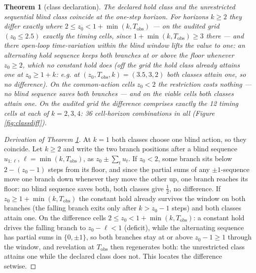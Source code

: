 \documentclass[10pt,twocolumn]{article}
\theoremstyle{plain}
\newtheorem{theorem}{Theorem}
\theoremstyle{definition}
\theoremstyle{remark}
\begin{document}
\begin{theorem}[class declaration]\label{thm:class}
The declared hold class and the unrestricted sequential blind class
coincide at the one-step horizon. For horizons \(k \ge 2\) they differ
exactly where \(2 \le z_{0} < 1 + \min(k, T_{\mathrm{obs}})\) --- on
the audited grid \((z_{0} \le 2.5)\) exactly the timing cells, since
\(1 + \min(k, T_{\mathrm{obs}}) \ge 3\) there --- and there open-loop
time-variation within the blind window lifts the value to one: an
alternating hold sequence keeps both branches at or above the floor
whenever \(z_{0} \ge 2\), which no constant hold does (off the grid
the hold class already attains one at \(z_{0} \ge 1 + k\): e.g. at
\((z_{0}, T_{\mathrm{obs}}, k) = (3.5, 3, 2)\) both classes attain
one, so no difference). On the
common-action cells \(z_{0} < 2\) the restriction costs nothing --- no
blind sequence saves both branches --- and on the viable cells both
classes attain one. On the audited grid the difference comprises exactly
the 12 timing cells at each of \(k = 2, 3, 4\): 36 cell-horizon
combinations in all (Figure \ref{fig:classdiff}).
\end{theorem}

\begin{proof}[Derivation of Theorem \ref{thm:class}]
At \(k = 1\) both classes choose one blind action, so they coincide. Let
\(k \ge 2\) and write the two branch positions after a blind sequence
\(u_{1:\ell}\), \(\ell = \min(k, T_{\mathrm{obs}})\), as
\(z_{0} \pm \sum_{t} u_{t}\). If \(z_{0} < 2\), some branch sits below
\(2 - (z_{0} - 1)\) steps from its floor, and since the partial sums of
any \(\pm1\)-sequence move one branch down whenever they move the other
up, one branch reaches its floor: no blind sequence saves both, both
classes give \(\tfrac{1}{2}\), no difference. If
\(z_{0} \ge 1 + \min(k, T_{\mathrm{obs}})\) the constant hold already
survives the window on both branches (the falling branch exits only
after \(k > z_{0} - 1\) steps) and both classes attain one. On the
difference cells \(2 \le z_{0} < 1 + \min(k, T_{\mathrm{obs}})\): a
constant hold drives the
falling branch to \(z_{0} - \ell < 1\) (deficit), while the alternating
sequence has partial sums in \(\{0, \pm 1\}\), so both branches stay at
or above \(z_{0} - 1 \ge 1\) through the window, and revelation at
\(T_{\mathrm{obs}}\) then regenerates both: the unrestricted class
attains one while the declared class does not. This locates the
difference setwise.
\end{proof}
\end{document}
